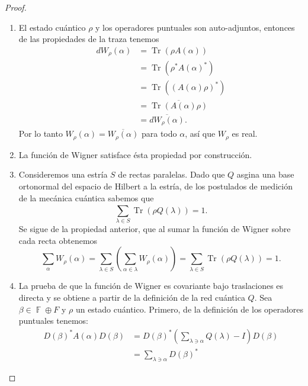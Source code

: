 \documentclass[a4paper]{report}
\DeclareMathOperator{\F}{\mathbb{F}}
\DeclareMathOperator{\Tr}{Tr}
\begin{document}
  \begin{proof}
    ${}$ 
    \begin{enumerate}
      \item El estado cuántico $\rho$ y los operadores
        puntuales son auto-adjuntos, entonces de las
        propiedades de la traza tenemos
        \begin{align}
          d W_\rho(\alpha)
          &= \Tr(\rho A(\alpha)) \\
          &= \Tr\left(\rho^{*} A(\alpha)^{*}\right) \\
          &= \Tr\left( (A(\alpha)\rho)^{*} \right) \\
          &= \overline{\Tr\left( A(\alpha)\rho \right)} \\
          &= \overline{d W_\rho(\alpha)}.
        \end{align}
        Por lo tanto $W_\rho(\alpha) =
        \overline{W_\rho(\alpha)}$ para todo $\alpha$, así
        que $W_\rho$ es real.
      \item La función de Wigner satisface ésta propiedad
        por construcción.
      \item Consideremos una estría $S$ de rectas paralelas.
        Dado que $Q$ asgina una base ortonormal del espacio
        de Hilbert a la estría, de los postulados de
        medición de la mecánica cuántica sabemos que
        \[
          \sum_{\lambda \in S}^{}
          \Tr\left( \rho Q(\lambda) \right)
          = 1.
        \] 
        Se sigue de la propiedad anterior, que al sumar la
        función de Wigner sobre cada recta obtenemos
        \begin{equation}
          \sum_{\alpha}^{} W_\rho(\alpha)
          = \sum_{\lambda \in S}^{} \left( 
            \sum_{\alpha \in \lambda}^{} W_\rho(\alpha)
          \right) 
          = \sum_{\lambda \in S}^{} \Tr(\rho Q(\lambda))
          = 1.
        \end{equation}
      \item La prueba de que la función de Wigner es
        covariante bajo traslaciones es directa y se obtiene
        a partir de la definición de la red cuántica $Q$.
        Sea $\beta \in \F \oplus F$ y $\rho$ un estado
        cuántico. Primero, de la definición de los
        operadores puntuales tenemos:
        \begin{align}
          D(\beta)^{*} A(\alpha) D(\beta)
          &= D(\beta)^{*} \left( \sum_{\lambda \ni
          \alpha}^{} Q(\lambda) - I \right) D(\beta) \\
          &= \sum_{\lambda \ni \alpha}^{} D(\beta)^{*}

\end{align}
\end{enumerate}
\end{proof}
\end{document}
